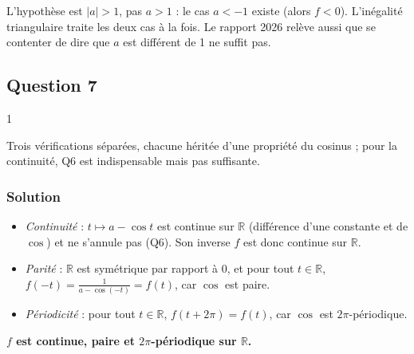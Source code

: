 \documentclass[11pt,a4paper]{article}
\providecommand{\tightlist}{\setlength{\itemsep}{0pt}\setlength{\parskip}{0pt}}
\newcommand{\equationajustee}[1]{%
  \sbox{\boiteequation}{$\displaystyle #1$}%
  \ifdim\wd\boiteequation>\linewidth
    \[\resizebox{\linewidth}{!}{\usebox{\boiteequation}}\]%
  \else
    \[#1\]%
  \fi}
\begin{document}
\equationajustee{\begin{aligned}|a-\cos t|&\ge|a|-|\cos t|\\ &\ge|a|-1\\ &>0.\end{aligned}}

\equationajustee{\boxed{\forall t\in\mathbb R,\quad a-\cos t\neq0.}}

\begin{piege}

L'hypothèse est \(|a|>1\), pas \(a>1\) : le cas \(a<-1\) existe (alors \(f<0\)). L'inégalité triangulaire traite les deux cas à la fois. Le rapport 2026 relève aussi que se contenter de dire que \(a\) est différent de 1 ne suffit pas.

\end{piege}

\hypertarget{question-7}{%
\subsection{Question 7}\label{question-7}}

\begin{indication}{1}

Trois vérifications séparées, chacune héritée d'une propriété du cosinus ; pour la continuité, Q6 est indispensable mais pas suffisante.

\end{indication}

\hypertarget{solution-6}{%
\subsubsection{Solution}\label{solution-6}}

\begin{itemize}
\tightlist
\item
  \emph{Continuité} : \(t\mapsto a-\cos t\) est continue sur \(\mathbb R\) (différence d'une constante et de \(\cos\)) et ne s'annule pas (Q6). Son inverse \(f\) est donc continue sur \(\mathbb R\).
\item
  \emph{Parité} : \(\mathbb R\) est symétrique par rapport à \(0\), et pour tout \(t\in\mathbb R\), \(f(-t)=\frac1{a-\cos(-t)}=f(t)\), car \(\cos\) est paire.
\item
  \emph{Périodicité} : pour tout \(t\in\mathbb R\), \(f(t+2\pi)=f(t)\), car \(\cos\) est \(2\pi\)-périodique.
\end{itemize}

\textbf{\(f\) est continue, paire et \(2\pi\)-périodique sur \(\mathbb R\).}
\end{document}

